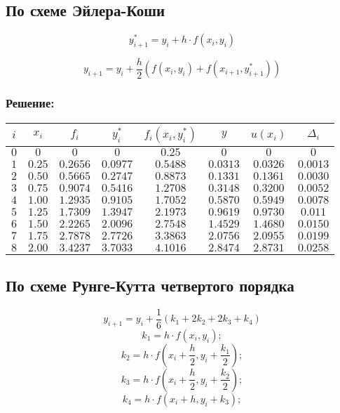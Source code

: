 \documentclass[a4paper,10pt,notitlepage,pdftex]{scrartcl}
\begin{document}
\subsection*{По схеме Эйлера-Коши}

$$y^*_{i+1} = y_i + h\cdot f(x_i,y_i)$$

$$y_{i+1} = y_i + \frac{h}{2}\left(f(x_i,y_i)+f(x_{i+1},y^*_{i+1})\right)$$

\subsubsection*{Решение:}
\begin{tabular}{|c|c|c|c|c|c|c|c|}
\hline
$i$	& $x_i$		& $f_i$		& $y^*_i$	& $f_i(x_i,y^*_i)$	& $y$		& $u(x_i)$	& $\Delta_i$\\
\hline
$0$	& $0$		& $0$		& $0$		& $0.25$			& $0$		& $0$		& $0$\\
$1$	& $0.25$	& $0.2656$	& $0.0977$	& $0.5488$			& $0.0313$	& $0.0326$	& $0.0013$\\
$2$	& $0.50$	& $0.5665$	& $0.2747$	& $0.8873$			& $0.1331$	& $0.1361$	& $0.0030$\\
$3$	& $0.75$	& $0.9074$	& $0.5416$	& $1.2708$			& $0.3148$	& $0.3200$	& $0.0052$\\
$4$	& $1.00$	& $1.2935$	& $0.9105$	& $1.7052$			& $0.5870$	& $0.5949$	& $0.0078$\\
$5$	& $1.25$	& $1.7309$	& $1.3947$	& $2.1973$			& $0.9619$	& $0.9730$	& $0.011$\\
$6$	& $1.50$	& $2.2265$	& $2.0096$	& $2.7548$			& $1.4529$	& $1.4680$	& $0.0150$\\
$7$	& $1.75$	& $2.7878$	& $2.7726$	& $3.3863$			& $2.0756$	& $2.0955$	& $0.0199$\\
$8$	& $2.00$	& $3.4237$	& $3.7033$	& $4.1016$			& $2.8474$	& $2.8731$	& $0.0258$\\
\hline
\end{tabular}

\subsection*{По схеме Рунге-Кутта четвертого порядка}

$$y_{i+1} = y_i + \frac{1}{6}(k_1 + 2 k_2 + 2 k_3 + k_4)$$
$$k_1 = h\cdot f(x_i, y_i);$$
$$k_2 = h\cdot f(x_i + \frac{h}{2}, y_i + \frac{k_1}{2});$$
$$k_3 = h\cdot f(x_i + \frac{h}{2}, y_i + \frac{k_2}{2});$$
$$k_4 = h\cdot f(x_i + h, y_i + k_3);$$
\end{document}
